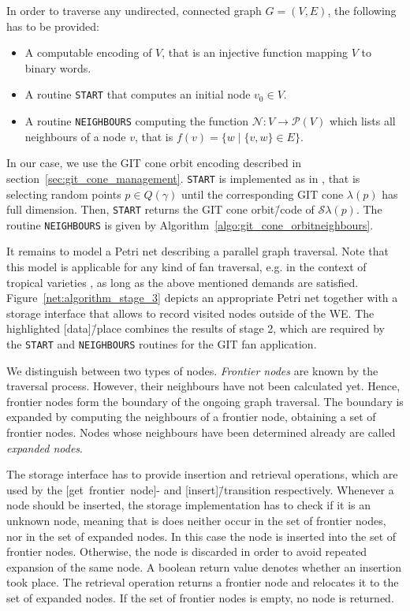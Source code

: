 
In order to traverse any undirected, connected graph $G=(V,E)$, the following has to be provided:

\begin{itemize}
	\item A computable encoding of $V$, that is an injective function mapping $V$ to binary words.
	\item A routine \texttt{START} that computes an initial node $v_0\in V$.
	\item A routine \texttt{NEIGHBOURS} computing the function $\mathcal{N}\colon V \rightarrow \mathcal{P}(V)$ which lists all neighbours of a node $v$, that is $f(v) = \{w \mid \{v,w\}\in E\}$.
\end{itemize}

In our case, we use the GIT cone orbit encoding described in section~\ref{sec:git_cone_management}. \texttt{START} is implemented as in \gitfanlib{}, that is selecting random points $p\in Q(\gamma)$ until the corresponding GIT cone $\lambda(p)$  has full dimension. Then, \texttt{START} returns the GIT cone orbit\=/code of $\mathcal{S}\lambda(p)$. The routine \texttt{NEIGHBOURS} is given by Algorithm~\ref{algo:git_cone_orbitneighbours}.

It remains to model a Petri net describing a parallel graph traversal. Note that this model is applicable for any kind of fan traversal, e.g. in the context of tropical varieties , as long as the above mentioned demands are satisfied. Figure~\ref{net:algorithm_stage_3} depicts an appropriate Petri net together with a storage interface that allows to record visited nodes outside of the \ac{WE}. The highlighted [data]\=/place combines the results of stage 2, which are required by the \texttt{START} and \texttt{NEIGHBOURS} routines for the GIT fan application.



We distinguish between two types of nodes. \emph{Frontier nodes} are known by the traversal process. However, their neighbours have not been calculated yet. Hence, frontier nodes form the boundary of the ongoing graph traversal. The boundary is expanded by computing the neighbours of a frontier node, obtaining a set of frontier nodes. Nodes whose neighbours have been determined already are called \emph{expanded nodes}.

The storage interface has to provide insertion and retrieval operations, which are used by the [get~frontier~node]- and [insert]\=/transition respectively. Whenever a node should be inserted, the storage implementation has to check if it is an unknown node, meaning that is does neither occur in the set of frontier nodes, nor in the set of expanded nodes. In this case the node is inserted into the set of frontier nodes. Otherwise, the node is discarded in order to avoid repeated expansion of the same node. A boolean return value denotes whether an insertion took place. The retrieval operation returns a frontier node and relocates it to the set of expanded nodes. If the set of frontier nodes is empty, no node is returned.

